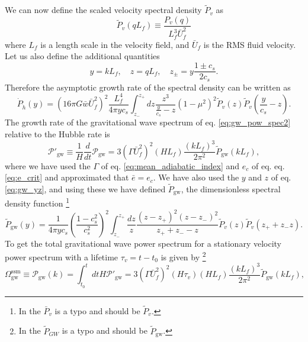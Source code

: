 We can now define the scaled velocity spectral density $\tilde{P}_v$ as
\begin{equation}
\tilde{P}_v (qL_f) \equiv \frac{P_v(q)}{L_f^3 \bar{U}_f^2}
\label{eq:tilde_p_v}
\end{equation}
where $L_f$ is a length scale in the velocity field, and $\bar{U}_f$ is the RMS fluid velocity.
Let us also define the additional quantities
\begin{equation}
y = kL_f, \quad z = qL_f, \quad z_\pm = y \frac{1 \pm c_s}{2 c_s}.
\label{eq:gw_yz}
\end{equation}
Therefore the asymptotic growth rate of the spectral density can be written as
\begin{equation}
\dot{P}_{\dot{h}}(y) =
\left( 16 \pi G \bar{w} \bar{U}_f^2 \right)^2
\frac{L_f^4}{4 \pi y c_s}
\int_{z_-}^{z_+} dz
\frac{z^3}{\frac{y}{c_s} - z}
(1 - \mu^2)^2
\tilde{P}_v (z) \tilde{P}_v \left( \frac{y}{c_s} - z \right).
\end{equation}
The growth rate of the gravitational wave spectrum of eq. \eqref{eq:gw_pow_spec2} relative to the Hubble rate is
\cite[eq. 3.46]{hindmarsh_gw_pt_2019}
\begin{equation}
\mathcal{P}'_{\text{gw}} \equiv \frac{1}{H} \frac{d}{dt} \mathcal{P}_{\text{gw}}
= 3 \left( \Gamma \bar{U}_f^2 \right)^2 (HL_f) \frac{(kL_f)^3}{2 \pi^2} \tilde{P}_{\text{gw}} (kL_f),
\label{eq:pow_gw_prime}
\end{equation}
where we have used the $\Gamma$ of eq. \eqref{eq:mean_adiabatic_index} and $e_c$ of eq. eq. \eqref{eq:e_crit} and approximated that $\bar{e} = e_c$.
We have also used the $y$ and $z$ of eq. \eqref{eq:gw_yz}, and using these we have defined $\tilde{P}_{\text{gw}}$,
the dimensionless spectral density function
\cite[eq. 3.47]{hindmarsh_gw_pt_2019}
\footnote{In \cite{hindmarsh_gw_pt_2019} the $\bar{P}_v$ is a typo and should be $\tilde{P}_v$.}
\begin{equation}
\tilde{P}_\text{gw} (y) = \frac{1}{4\pi yc_s} \left(\frac{1-c_s^2}{c_s^2}\right)^2
\int_{z_-}^{z_+} \frac{dz}{z}
\frac{(z-z_+)^2(z-z_-)^2}{z_+ + z_- - z}
\tilde{P}_v (z) \tilde{P}_v (z_+ + z_- z).
\label{eq:spectral_density}
\end{equation}
To get the total gravitational wave power spectrum for a stationary velocity power spectrum with a lifetime $\tau_v = t - t_0$ is given by
\cite[eq. 3.48]{hindmarsh_gw_pt_2019}
\footnote{In \cite{hindmarsh_gw_pt_2019} the $\tilde{P}_{GW}$ is a typo and should be $\tilde{P}_\text{gw}$.}
\begin{equation}
\Omega_\text{gw}^\text{ssm}
\equiv \mathcal{P}_\text{gw}(k)
= \int_{t_0}^{t} dt H \mathcal{P}'_\text{gw}
= 3 \left( \Gamma \bar{U}_f^2 \right)^2 (H \tau_v)(H L_f) \frac{(kL_f)^3}{2\pi^2} \tilde{P}_\text{gw} (kL_f),
\label{eq:gw_pow_spec3}
\end{equation}
